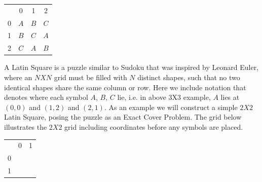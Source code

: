 \documentclass{article}
\begin{document}
\begin{center}
\begin{tabular}{cccc}
 & 0 & 1 & 2\\ \cline{2-4} 
\multicolumn{1}{c|}{0} & \multicolumn{1}{c|}{$A$} & \multicolumn{1}{c|}{$B$}& \multicolumn{1}{c|}{$C$} \\ \cline{2-4} 
\multicolumn{1}{c|}{1} & \multicolumn{1}{c|}{$B$} & \multicolumn{1}{c|}{$C$}& \multicolumn{1}{c|}{$A$} \\ \cline{2-4} 
\multicolumn{1}{c|}{2} & \multicolumn{1}{c|}{$C$} & \multicolumn{1}{c|}{$A$}& \multicolumn{1}{c|}{$B$} \\ \cline{2-4} 
\end{tabular}
\end{center}
A Latin Square is a puzzle similar to Sudoku that was inspired by Leonard Euler, where an $N X N$ grid must be filled with $N$ distinct shapes, such that no two identical shapes share the same column or row. Here we include notation that denotes where each symbol $A$, $B$, $C$ lie, i.e. in above 3X3 example, $A$ lies at $(0,0)$ and $(1,2)$ and $(2,1)$. As an example we will construct a simple $2 X 2$ Latin Square, posing the puzzle as an Exact Cover Problem. The grid below illustrates the $2 X 2$ grid including coordinates before any symbols are placed.
\begin{center}
\begin{tabular}{ccc}
 & 0 & 1 \\ \cline{2-3} 
\multicolumn{1}{c|}{0} & \multicolumn{1}{c|}{} & \multicolumn{1}{c|}{} \\ \cline{2-3} 
\multicolumn{1}{c|}{1} & \multicolumn{1}{c|}{} & \multicolumn{1}{c|}{} \\ \cline{2-3} 
\end{tabular}
\end{center}
\end{document}
